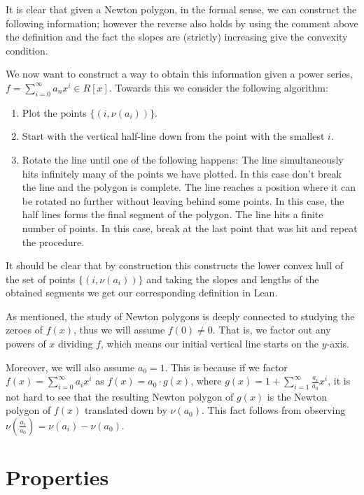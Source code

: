 It is clear that given a Newton polygon, in the formal sense, we can construct the following information;
however the reverse also holds by using the comment above the definition and the fact the slopes are
(strictly) increasing give the convexity condition.

We now want to construct a way to obtain this information given a power series, $f = \sum_{i=0}^\infty a_n x^i \in R[x]$.
Towards this we consider the following algorithm:

\begin{enumerate}
    \item Plot the points $\{(i,\nu (a_i) )\}$.
    \item Start with the vertical half-line down from the point with the smallest $i$.
    \item Rotate the line until one of the following happens:
    \subitem The line simultaneously hits infinitely many of the points we have plotted. In this
        case don't break the line and the polygon is complete.
    \subitem The line reaches a position where it can be rotated no further without leaving behind
        some points. In this case, the half lines forms the final segment of the polygon.
    \subitem The line hits a finite number of points. In this case, break at the last point that was
        hit and repeat the procedure.
\end{enumerate}

It should be clear that by construction this constructs the lower convex hull of the set of points
$\{(i,\nu (a_i) )\}$ and taking the slopes and lengths of the obtained segments we get our corresponding
definition in Lean.

As mentioned, the study of Newton polygons is deeply connected to studying the zeroes of $f(x)$,
thus we will assume $f(0) \neq 0$. That is, we factor out any powers of $x$ dividing $f$, which
means our initial vertical line starts on the $y$-axis.

Moreover, we will also assume $a_0 = 1$. This is because if we factor
$f(x) = \sum_{i = 0}^\infty a_i x^i$ as $f(x) = a_0 \cdot g(x)$, where
$g(x) = 1 + \sum_{i=1}^\infty \frac{a_i}{a_0}x^i$, it is not hard to see that the resulting Newton
polygon of $g(x)$ is the Newton polygon of $f(x)$ translated down by $\nu (a_0)$.
This fact follows from observing $\nu (\frac{a_i}{a_0}) = \nu(a_i) - \nu (a_0)$.

\section{Properties}

